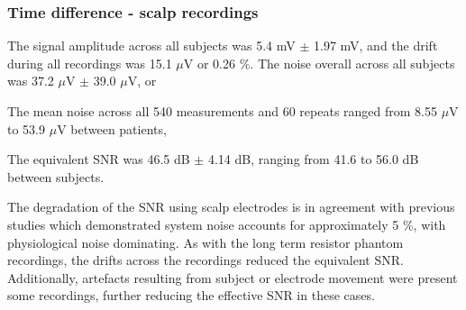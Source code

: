 
\subsubsection{Time difference - scalp recordings}
The signal amplitude across all subjects was 5.4 mV $\pm$ 1.97 mV, and the drift during all recordings was 15.1 $\mu$V or 0.26 \%. The noise overall across all subjects was 37.2  $\mu$V $\pm$ 39.0 $\mu$V, or 


The mean noise across all 540 measurements and 60 repeats ranged from 8.55 $\mu$V to 53.9 $\mu$V between patients,


 The equivalent SNR was 46.5 dB $\pm$ 4.14 dB, ranging from 41.6 to 56.0 dB between subjects. 
 
 
 
 The degradation of the SNR using scalp electrodes is in agreement with previous studies \cite{fabrizi2007analysis} which demonstrated system noise accounts for approximately 5 \%, with physiological noise dominating. As with the long term resistor phantom recordings, the drifts across the recordings reduced the equivalent SNR. Additionally, artefacts resulting from subject or electrode movement were present some recordings, further reducing the effective SNR in these cases.  
